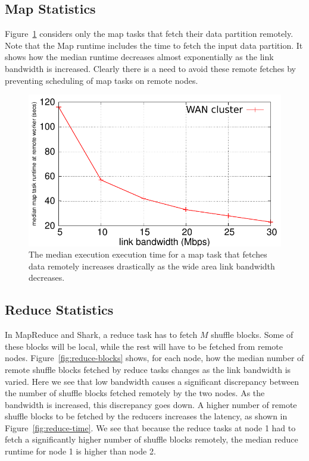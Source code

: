 \subsection{Map Statistics}

Figure~\ref{fig:map-time} considers only the map tasks that fetch their data partition remotely. Note that the Map runtime includes the time to fetch the input data partition. It shows how the median runtime decreases almost exponentially as the link bandwidth is increased. Clearly there is a need to avoid these remote fetches
by preventing scheduling of map tasks on remote nodes. 

\begin{figure}[!ht]
\centering\includegraphics[width=\columnwidth]{figs/map-time.pdf}
\vspace{-1.2em}
\caption{The median execution execution time for a map task that fetches data remotely increases drastically as the wide area link bandwidth decreases.}
\label{fig:map-time}
\vspace{.7em}
\end{figure}

\subsection{Reduce Statistics}

In MapReduce and Shark, a reduce task has to fetch $M$ shuffle blocks. Some of these blocks will be local, while the rest will have to be fetched from remote nodes.  Figure~\ref{fig:reduce-blocks} shows, for each node, how the median number of remote shuffle blocks fetched by reduce tasks changes as the link bandwidth is varied. Here we see that low bandwidth causes a significant discrepancy between the number of shuffle blocks fetched remotely by the two nodes. As the bandwidth is increased, this discrepancy goes down. A higher number of remote shuffle blocks to be fetched by the reducers increases the latency, as shown in Figure~\ref{fig:reduce-time}. We see that because the reduce tasks at node 1 had to fetch a significantly higher number of shuffle blocks remotely, the median reduce runtime for node 1 is higher than node 2.   

